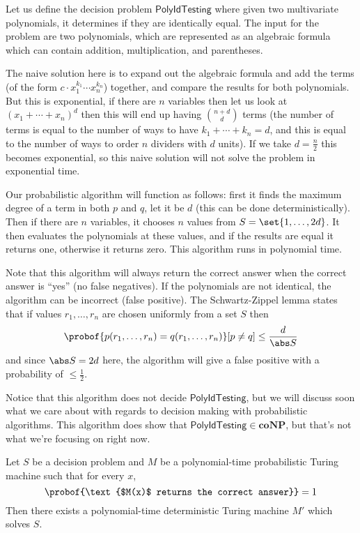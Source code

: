 \documentclass[10pt]{article}
\def\polyidtest{\mathsf{PolyIdTesting}}
\def\coNP{\mathbf{coNP}}
\begin{document}
\begin{exam*}

    Let us define the decision problem $\polyidtest$ where given two multivariate polynomials, it determines if they are identically equal.
    The input for the problem are two polynomials, which are represented as an algebraic formula which can contain addition, multiplication, and parentheses.

    The naive solution here is to expand out the algebraic formula and add the terms (of the form $c\cdot x_1^{k_1}\cdots x_n^{k_n}$) together, and compare the results for both polynomials.
    But this is exponential, if there are $n$ variables then let us look at $(x_1+\cdots+x_n)^d$ then this will end up having $\binom{n+d}d$ terms (the number of terms is equal to the number of ways to
    have $k_1+\cdots+k_n=d$, and this is equal to the number of ways to order $n$ dividers with $d$ units).
    If we take $d=\frac n2$ this becomes exponential, so this naive solution will not solve the problem in exponential time.

    Our probabilistic algorithm will function as follows: first it finds the maximum degree of a term in both $p$ and $q$, let it be $d$ (this can be done deterministically).
    Then if there are $n$ variables, it chooses $n$ values from $S=\set{1,\dots,2d}$.
    It then evaluates the polynomials at these values, and if the results are equal it returns one, otherwise it returns zero.
    This algorithm runs in polynomial time.

    Note that this algorithm will always return the correct answer when the correct answer is ``yes'' (no false negatives).
    If the polynomials are not identical, the algorithm can be incorrect (false positive).
    The Schwartz-Zippel lemma states that if values $r_1,\dots,r_n$ are chosen uniformly from a set $S$ then
    \[ \probof{p(r_1,\dots,r_n)=q(r_1,\dots,r_n)}[p\neq q] \leq \frac d{\abs S} \]
    and since $\abs S=2d$ here, the algorithm will give a false positive with a probability of $\leq\frac12$.

    Notice that this algorithm does not decide $\polyidtest$, but we will discuss soon what we care about with regards to decision making with probabilistic algorithms.
    This algorithm does show that $\polyidtest\in\coNP$, but that's not what we're focusing on right now.

\end{exam*}

\begin{prop*}

    Let $S$ be a decision problem and $M$ be a polynomial-time probabilistic Turing machine such that for every $x$,
    \[ \probof{\text{$M(x)$ returns the correct answer}} = 1 \]
    Then there exists a polynomial-time deterministic Turing machine $M'$ which solves $S$.

\end{prop*}
\end{document}
